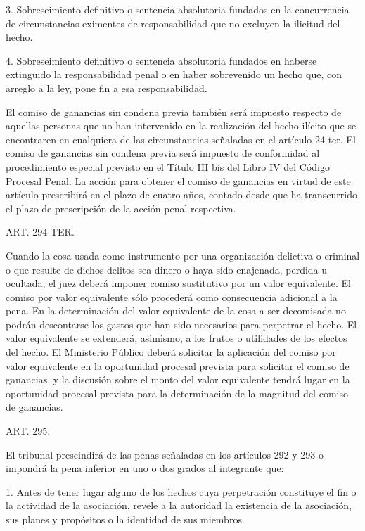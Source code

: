     3. Sobreseimiento definitivo o sentencia absolutoria fundados en la concurrencia de circunstancias eximentes de responsabilidad que no excluyen la ilicitud del hecho.

    4. Sobreseimiento definitivo o sentencia absolutoria fundados en haberse extinguido la responsabilidad penal o en haber sobrevenido un hecho que, con arreglo a la ley, pone fin a esa responsabilidad.

    El comiso de ganancias sin condena previa también será impuesto respecto de aquellas personas que no han intervenido en la realización del hecho ilícito que se encontraren en cualquiera de las circunstancias señaladas en el artículo 24 ter.
    El comiso de ganancias sin condena previa será impuesto de conformidad al procedimiento especial previsto en el Título III bis del Libro IV del Código Procesal Penal.
    La acción para obtener el comiso de ganancias en virtud de este artículo prescribirá en el plazo de cuatro años, contado desde que ha transcurrido el plazo de prescripción de la acción penal respectiva.


    ART. 294 TER.

    Cuando la cosa usada como instrumento por una organización delictiva o criminal o que resulte de dichos delitos sea dinero o haya sido enajenada, perdida u ocultada, el juez deberá imponer comiso sustitutivo por un valor equivalente.
    El comiso por valor equivalente sólo procederá como consecuencia adicional a la pena. En la determinación del valor equivalente de la cosa a ser decomisada no podrán descontarse los gastos que han sido necesarios para perpetrar el hecho. El valor equivalente se extenderá, asimismo, a los frutos o utilidades de los efectos del hecho.
    El Ministerio Público deberá solicitar la aplicación del comiso por valor equivalente en la oportunidad procesal prevista para solicitar el comiso de ganancias, y la discusión sobre el monto del valor equivalente tendrá lugar en la oportunidad procesal prevista para la determinación de la magnitud del comiso de ganancias.


    ART. 295.

    El tribunal prescindirá de las penas señaladas en los artículos 292 y 293 o impondrá la pena inferior en uno o dos grados al integrante que:

    1. Antes de tener lugar alguno de los hechos cuya perpetración constituye el fin o la actividad de la asociación, revele a la autoridad la existencia de la asociación, sus planes y propósitos o la identidad de sus miembros.

